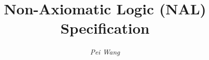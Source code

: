 
\setcounter{tocdepth}{1}



\title{{\huge {\bf Non-Axiomatic Logic (NAL) Specification}}}
\author{\em Pei Wang}
\maketitle

\newtheorem{defi}{Definition}
\newtheorem{theo}{Theorem}

\tableofcontents
\listoftables

\newpage
{}













\small
{}
%
%



